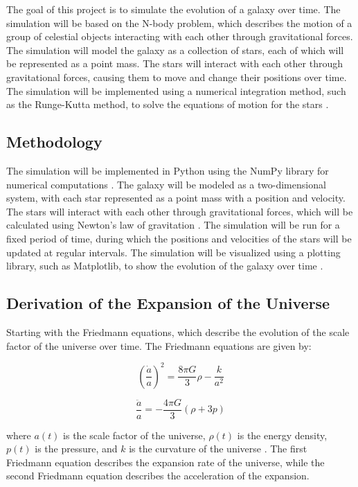 \documentclass[10pt]{article}
\begin{document}
The goal of this project is to simulate the evolution of a galaxy over time. The simulation will be based on the N-body problem, which describes the motion of a group of celestial objects interacting with each other through gravitational forces. The simulation will model the galaxy as a collection of stars, each of which will be represented as a point mass. The stars will interact with each other through gravitational forces, causing them to move and change their positions over time. The simulation will be implemented using a numerical integration method, such as the Runge-Kutta method, to solve the equations of motion for the stars \cite{binney2008galactic}.

\subsection*{Methodology}

The simulation will be implemented in Python using the NumPy library for numerical computations \cite{harris2020array}. The galaxy will be modeled as a two-dimensional system, with each star represented as a point mass with a position and velocity. The stars will interact with each other through gravitational forces, which will be calculated using Newton's law of gravitation \cite{newton1687principia}. The simulation will be run for a fixed period of time, during which the positions and velocities of the stars will be updated at regular intervals. The simulation will be visualized using a plotting library, such as Matplotlib, to show the evolution of the galaxy over time \cite{hunter2007matplotlib}.

\subsection*{Derivation of the Expansion of the Universe}

Starting with the Friedmann equations, which describe the evolution of the scale factor of the universe over time. The Friedmann equations are given by:

\begin{equation}
\left(\frac{\dot{a}}{a}\right)^2 = \frac{8\pi G}{3} \rho - \frac{k}{a^2}
\end{equation}

\begin{equation}
\frac{\ddot{a}}{a} = -\frac{4\pi G}{3} (\rho + 3p)
\end{equation}

where $a(t)$ is the scale factor of the universe, $\rho(t)$ is the energy density, $p(t)$ is the pressure, and $k$ is the curvature of the universe \cite{friedmann1922}. The first Friedmann equation describes the expansion rate of the universe, while the second Friedmann equation describes the acceleration of the expansion.
\end{document}
